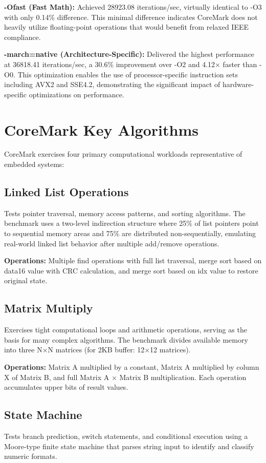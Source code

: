 \documentclass[11pt,a4paper]{article}
\begin{document}
\textbf{-Ofast (Fast Math):} Achieved 28923.08 iterations/sec, virtually identical to -O3 with only 0.14\% difference. This minimal difference indicates CoreMark does not heavily utilize floating-point operations that would benefit from relaxed IEEE compliance.

\textbf{-march=native (Architecture-Specific):} Delivered the highest performance at 36818.41 iterations/sec, a 30.6\% improvement over -O2 and 4.12× faster than -O0. This optimization enables the use of processor-specific instruction sets including AVX2 and SSE4.2, demonstrating the significant impact of hardware-specific optimizations on performance.

\section{CoreMark Key Algorithms}

CoreMark exercises four primary computational workloads representative of embedded systems:

\subsection{Linked List Operations}
Tests pointer traversal, memory access patterns, and sorting algorithms. The benchmark uses a two-level indirection structure where 25\% of list pointers point to sequential memory areas and 75\% are distributed non-sequentially, emulating real-world linked list behavior after multiple add/remove operations.

\textbf{Operations:} Multiple find operations with full list traversal, merge sort based on data16 value with CRC calculation, and merge sort based on idx value to restore original state.

\subsection{Matrix Multiply}
Exercises tight computational loops and arithmetic operations, serving as the basis for many complex algorithms. The benchmark divides available memory into three N×N matrices (for 2KB buffer: 12×12 matrices).

\textbf{Operations:} Matrix A multiplied by a constant, Matrix A multiplied by column X of Matrix B, and full Matrix A × Matrix B multiplication. Each operation accumulates upper bits of result values.

\subsection{State Machine}
Tests branch prediction, switch statements, and conditional execution using a Moore-type finite state machine that parses string input to identify and classify numeric formats.
\end{document}
